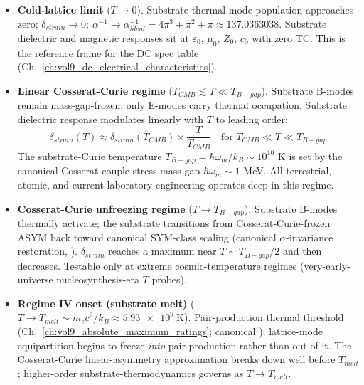 \begin{itemize}
    \item \textbf{Cold-lattice limit} ($T \to 0$). Substrate thermal-mode population approaches zero; $\delta_{strain} \to 0$; $\alpha^{-1} \to \alpha^{-1}_{ideal} = 4\pi^3 + \pi^2 + \pi \approx 137.0363038$. Substrate dielectric and magnetic responses sit at $\varepsilon_0$, $\mu_0$, $Z_0$, $c_0$ with zero TC. This is the reference frame for the DC spec table (Ch.~\ref{ch:vol9_dc_electrical_characteristics}).

    \item \textbf{Linear Cosserat-Curie regime} ($T_{CMB} \lesssim T \ll T_{B-gap}$). Substrate B-modes remain mass-gap-frozen; only E-modes carry thermal occupation. Substrate dielectric response modulates linearly with $T$ to leading order:
    \begin{equation}
        \delta_{strain}(T) \approx \delta_{strain}(T_{CMB}) \times \frac{T}{T_{CMB}} \quad \text{for } T_{CMB} \ll T \ll T_{B-gap}
    \end{equation}
    The substrate-Curie temperature $T_{B-gap} = \hbar\omega_m/k_B \sim 10^{10}$ K is set by the canonical Cosserat couple-stress mass-gap $\hbar\omega_m \sim 1$ MeV. All terrestrial, atomic, and current-laboratory engineering operates deep in this regime.

    \item \textbf{Cosserat-Curie unfreezing regime} ($T \to T_{B-gap}$). Substrate B-modes thermally activate; the substrate transitions from Cosserat-Curie-frozen ASYM back toward canonical SYM-class scaling (canonical $\alpha$-invariance restoration, ). $\delta_{strain}$ reaches a maximum near $T \sim T_{B-gap}/2$ and then decreases. Testable only at extreme cosmic-temperature regimes (very-early-universe nucleosynthesis-era $T$ probes).

    \item \textbf{Regime IV onset (substrate melt)} ($T \to T_{melt} \sim m_e c^2/k_B \approx \qty{5.93e9}{\kelvin}$). Pair-production thermal threshold (Ch.~\ref{ch:vol9_absolute_maximum_ratings}; canonical ); lattice-mode equipartition begins to freeze \emph{into} pair-production rather than out of it. The Cosserat-Curie linear-asymmetry approximation breaks down well before $T_{melt}$; higher-order substrate-thermodynamics governs as $T \to T_{melt}$.
\end{itemize}

